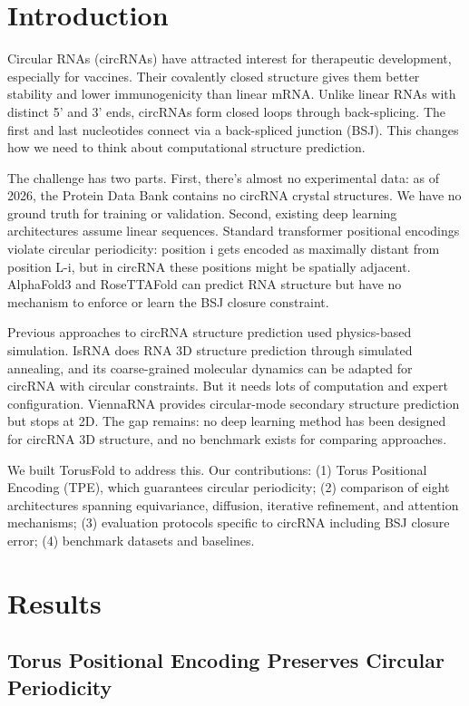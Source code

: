 \section{Introduction}

Circular RNAs (circRNAs) have attracted interest for therapeutic development, especially for vaccines. Their covalently closed structure gives them better stability and lower immunogenicity than linear mRNA. Unlike linear RNAs with distinct 5' and 3' ends, circRNAs form closed loops through back-splicing. The first and last nucleotides connect via a back-spliced junction (BSJ). This changes how we need to think about computational structure prediction.

The challenge has two parts. First, there's almost no experimental data: as of 2026, the Protein Data Bank contains no circRNA crystal structures. We have no ground truth for training or validation. Second, existing deep learning architectures assume linear sequences. Standard transformer positional encodings violate circular periodicity: position i gets encoded as maximally distant from position L-i, but in circRNA these positions might be spatially adjacent. AlphaFold3 and RoseTTAFold can predict RNA structure but have no mechanism to enforce or learn the BSJ closure constraint.

Previous approaches to circRNA structure prediction used physics-based simulation. IsRNA does RNA 3D structure prediction through simulated annealing, and its coarse-grained molecular dynamics can be adapted for circRNA with circular constraints. But it needs lots of computation and expert configuration. ViennaRNA provides circular-mode secondary structure prediction but stops at 2D. The gap remains: no deep learning method has been designed for circRNA 3D structure, and no benchmark exists for comparing approaches.

We built TorusFold to address this. Our contributions: (1) Torus Positional Encoding (TPE), which guarantees circular periodicity; (2) comparison of eight architectures spanning equivariance, diffusion, iterative refinement, and attention mechanisms; (3) evaluation protocols specific to circRNA including BSJ closure error; (4) benchmark datasets and baselines.

\section{Results}

\subsection{Torus Positional Encoding Preserves Circular Periodicity}

